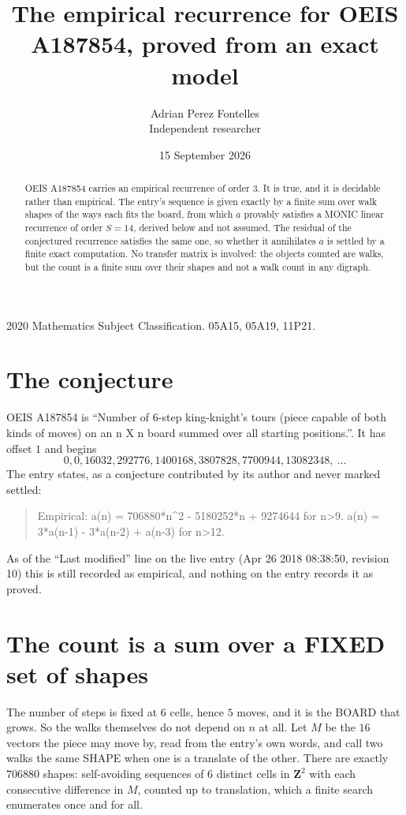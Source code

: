 \documentclass[11pt,a4paper]{article}
\title{The empirical recurrence for OEIS A187854, proved from an exact model}
\author{Adrian Perez Fontelles\\ \small Independent researcher}
\date{15 September 2026}
\theoremstyle{plain}
\theoremstyle{definition}
\begin{document}
\maketitle

\begin{abstract}
OEIS A187854 carries an empirical recurrence of order $3$. It is true, and it is
decidable rather than empirical. The entry's sequence is given exactly by a finite sum over walk shapes of the ways each fits the board, from
which $a$ provably satisfies a MONIC linear recurrence of order $S=14$, derived below and not
assumed. The residual of the conjectured recurrence satisfies the same one, so whether it
annihilates $a$ is settled by a finite exact computation. No transfer matrix is involved: the objects counted are walks, but the count is a finite sum over their shapes and not a walk count in any digraph.
\end{abstract}

\noindent\small 2020 Mathematics Subject Classification. 05A15, 05A19, 11P21.\normalsize

\section{The conjecture}

OEIS A187854 is ``Number of 6-step king-knight's tours (piece capable of both kinds of moves) on an n X n board summed over all starting positions.''. It has offset $1$ and begins
\[
0, 0, 16032, 292776, 1400168, 3807828, 7700944, 13082348,\ \dots
\]
The entry states, as a conjecture contributed by its author and never marked settled:
\begin{quote}
Empirical: a(n) = 706880*n\^{}2 - 5180252*n + 9274644 for n>9. a(n) = 3*a(n-1) - 3*a(n-2) + a(n-3) for n>12.
\end{quote}
As of the ``Last modified'' line on the live entry (Apr 26 2018 08:38:50, revision 10)
this is still recorded as empirical, and nothing on the entry records it as proved.

\section{The count is a sum over a FIXED set of shapes}

The number of steps is fixed at $6$ cells, hence $5$ moves, and it is the BOARD
that grows. So the walks themselves do not depend on $n$ at all. Let $M$ be the $16$
vectors the piece may move by, read from the entry's own words, and call two walks the same
SHAPE when one is a translate of the other. There are exactly $706880$ shapes: self-avoiding
sequences of $6$ distinct cells in $\mathbf{Z}^{2}$ with each consecutive difference in
$M$, counted up to translation, which a finite search enumerates once and for all.
\end{document}
